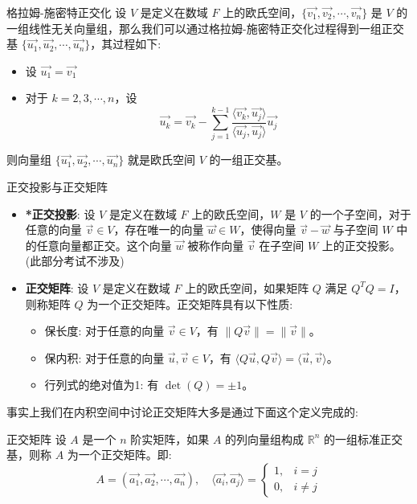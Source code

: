 \documentclass[a4paper,12pt]{ctexart}
\begin{document}
\newpage

    \begin{mythm}{格拉姆-施密特正交化}{}
    设 $V$ 是定义在数域 $F$ 上的欧氏空间，$\{\vec{v_1}, \vec{v_2}, \cdots, \vec{v_n}\}$ 是 $V$ 的一组线性无关向量组，那么我们可以通过格拉姆-施密特正交化过程得到一组正交基 $\{\vec{u_1}, \vec{u_2}, \cdots, \vec{u_n}\}$，其过程如下:
    \begin{itemize}
        \item 设 $\vec{u_1} = \vec{v_1}$
        \item 对于 $k = 2, 3, \cdots, n$，设
        \[
        \vec{u_k} = \vec{v_k} - \sum_{j=1}^{k-1} \frac{\langle \vec{v_k}, \vec{u_j} \rangle}{\langle \vec{u_j}, \vec{u_j} \rangle} \vec{u_j}
        \]
    \end{itemize}
    则向量组 $\{\vec{u_1}, \vec{u_2}, \cdots, \vec{u_n}\}$ 就是欧氏空间 $V$ 的一组正交基。
    \end{mythm}
    
    \begin{mydef}{正交投影与正交矩阵}{}
    \begin{itemize}
    \item \textbf{*正交投影}: 设 $V$ 是定义在数域 $F$ 上的欧氏空间，$W$ 是 $V$ 的一个子空间，对于任意的向量 $\vec{v} \in V$，存在唯一的向量 $\vec{w} \in W$，使得向量 $\vec{v} - \vec{w}$ 与子空间 $W$ 中的任意向量都正交。这个向量 $\vec{w}$ 被称作向量 $\vec{v}$ 在子空间 $W$ 上的正交投影。(此部分考试不涉及)
    
    \item \textbf{正交矩阵}: 设 $V$ 是定义在数域 $F$ 上的欧氏空间，如果矩阵 $Q$ 满足 $Q^T Q = I$，则称矩阵 $Q$ 为一个正交矩阵。正交矩阵具有以下性质:
    \begin{itemize}
        \item 保长度: 对于任意的向量 $\vec{v} \in V$，有 $\|Q \vec{v}\| = \|\vec{v}\|$。
        \item 保内积: 对于任意的向量 $\vec{u}, \vec{v} \in V$，有 $\langle Q \vec{u}, Q \vec{v} \rangle = \langle \vec{u}, \vec{v} \rangle$。
        \item 行列式的绝对值为1: 有 $\det(Q) = \pm 1$。
    \end{itemize}
    \end{itemize}
    \end{mydef}

事实上我们在内积空间中讨论正交矩阵大多是通过下面这个定义完成的:

\begin{mydef}{正交矩阵}{}
设 $A$ 是一个 $n$ 阶实矩阵，如果 $A$ 的列向量组构成 $\mathbb{R}^n$ 的一组标准正交基，则称 $A$ 为一个正交矩阵。即:
\[
A = (\vec{a_1}, \vec{a_2}, \cdots, \vec{a_n}), \quad \langle \vec{a_i}, \vec{a_j} \rangle = \begin{cases} 1, & i = j \\ 0, & i \neq j \end{cases}
\]
\end{mydef}
\end{document}
